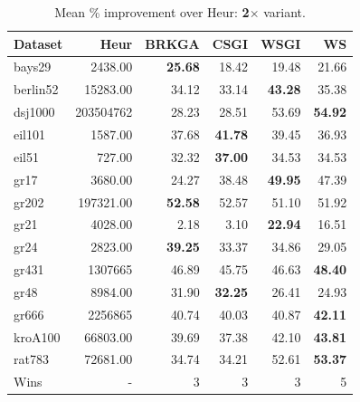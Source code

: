 \documentclass[sigconf]{acmart}
\begin{document}
\begin{table}[t]
\centering
\caption{Mean \% improvement over Heur: \textbf{2$\times$} variant.}
\label{tab:2x}
\small
\begin{tabular}{lrrrrr}
\toprule
Dataset & Heur & BRKGA & CSGI & WSGI & WS \\
\midrule
bays29 & 2438.00 & \textbf{25.68} & 18.42 & 19.48 & 21.66 \\
berlin52 & 15283.00 & 34.12 & 33.14 & \textbf{43.28} & 35.38 \\
dsj1000 & 203504762 & 28.23 & 28.51 & 53.69 & \textbf{54.92} \\
eil101 & 1587.00 & 37.68 & \textbf{41.78} & 39.45 & 36.93 \\
eil51 & 727.00 & 32.32 & \textbf{37.00} & 34.53 & 34.53 \\
gr17 & 3680.00 & 24.27 & 38.48 & \textbf{49.95} & 47.39 \\
gr202 & 197321.00 & \textbf{52.58} & 52.57 & 51.10 & 51.92 \\
gr21 & 4028.00 & 2.18 & 3.10 & \textbf{22.94} & 16.51 \\
gr24 & 2823.00 & \textbf{39.25} & 33.37 & 34.86 & 29.05 \\
gr431 & 1307665 & 46.89 & 45.75 & 46.63 & \textbf{48.40} \\
gr48 & 8984.00 & 31.90 & \textbf{32.25} & 26.41 & 24.93 \\
gr666 & 2256865 & 40.74 & 40.03 & 40.87 & \textbf{42.11} \\
kroA100 & 66803.00 & 39.69 & 37.38 & 42.10 & \textbf{43.81} \\
rat783 & 72681.00 & 34.74 & 34.21 & 52.61 & \textbf{53.37} \\
\midrule
Wins & - & 3 & 3 & 3 & 5 \\
\bottomrule
\end{tabular}
\end{table}
\end{document}
